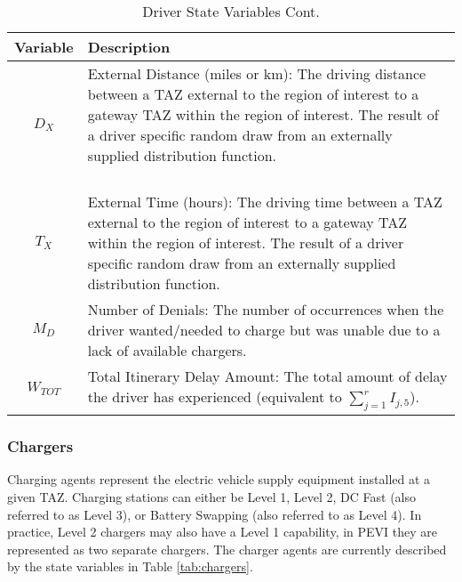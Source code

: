 \documentclass[journal]{IEEEtran}
\begin{document}
\begin{table}[!h]
\def\colmargin{6.75cm}
\renewcommand{\arraystretch}{1.3}
\caption{Driver State Variables Cont.}
\label{tab:drivers2}
\centering
\begin{tabular}{|cl|}
\hline
Variable & Description\\
\hline
$D_X$ & \parbox[t]{\colmargin}{ \raggedright External Distance (miles or km): The driving distance between a TAZ external to the region of interest to a gateway TAZ within the region of interest. The result of a driver specific random draw from an externally supplied distribution function.\\~ }\\
$T_X$ & \parbox[t]{\colmargin}{ \raggedright External Time (hours): The driving time between a TAZ external to the region of interest to a gateway TAZ within the region of interest. The result of a driver specific random draw from an externally supplied distribution function.}\\
$M_D$ & \parbox[t]{\colmargin}{ \raggedright Number of Denials: The number of occurrences when the driver wanted/needed to charge but was unable due to a lack of available chargers.}\\
$W_{TOT}$ & \parbox[t]{\colmargin}{ \raggedright Total Itinerary Delay Amount: The total amount of delay the driver has experienced (equivalent to $\sum_{j=1}^r I_{j,5}$). }\\
\hline
\end{tabular}
\end{table}

\subsubsection{Chargers}

Charging agents represent the electric vehicle supply equipment installed at a given TAZ.  Charging stations can either be Level 1, Level 2, DC Fast (also referred to as Level 3), or Battery Swapping (also referred to as Level 4).  In practice, Level 2 chargers may also have a Level 1 capability, in PEVI they are represented as two separate chargers.  The charger agents are currently described by the state variables in Table \ref{tab:chargers}.
\end{document}
